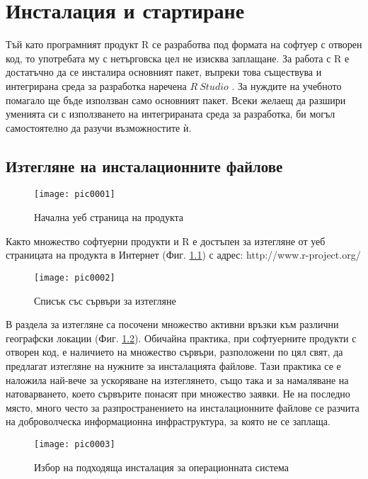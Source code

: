 \newpage
\chapter{Инсталация и стартиране}
\label{chapter01}
\thispagestyle{empty}

Тъй като програмният продукт R се разработва под формата на софтуер с отворен код, то употребата му с нетърговска цел не изисква заплащане. За работа с R е достатъчно да се инсталира основният пакет, въпреки това съществува и интегрирана среда за разработка наречена $R\ Studio$ \cite{rstudio}. За нуждите на учебното помагало ще бъде използван само основният пакет. Всеки желаещ да разшири уменията си с използването на интегрираната среда за разработка, би могъл самостоятелно да разучи възможностите ѝ.

\section{Изтегляне на инсталационните файлове}

\begin{figure}[h!]
  \centering
  \texttt{[image: pic0001]}
  \caption{Начална уеб страница на продукта}
\label{figure0001}
\end{figure}
\FloatBarrier

Както множество софтуерни продукти и R е достъпен за изтегляне от уеб страницата на продукта в Интернет (Фиг. \ref{figure0001}) с адрес: http://www.r-project.org/

\begin{figure}[h]
  \centering
  \texttt{[image: pic0002]}
  \caption{Списък със сървъри за изтегляне}
\label{figure0002}
\end{figure}
\FloatBarrier

В раздела за изтегляне са посочени множество активни връзки към различни географски локации (Фиг. \ref{figure0002}). Обичайна практика, при софтуерните продукти с отворен код, е наличието на множество сървъри, разположени по цял свят, да предлагат изтегляне на нужните за инсталацията файлове. Тази практика се е наложила най-вече за ускоряване на изтеглянето, също така и за намаляване на натоварването, което сървърите понасят при множество заявки. Не на последно място, много често за разпространението на инсталационните файлове се разчита на доброволческа информационна инфраструктура, за която не се заплаща.

\begin{figure}[h]
  \centering
  \texttt{[image: pic0003]}
  \caption{Избор на подходяща инсталация за операционната система }
\label{figure0003}
\end{figure}
\FloatBarrier

